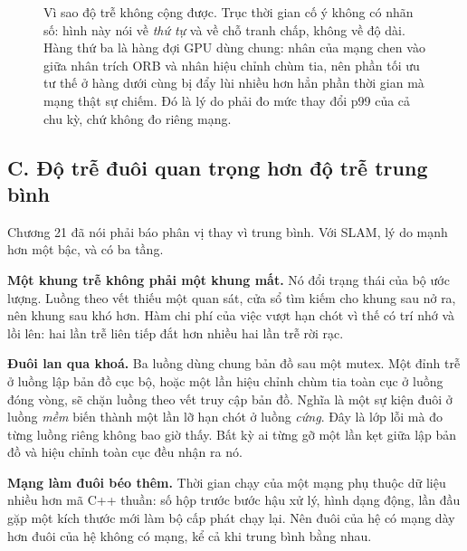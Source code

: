 \documentclass[../../deep_learning.tex]{subfiles}
\begin{document}
\begin{figure}[H]
{}
\caption{Vì sao độ trễ không cộng được. Trục thời gian cố ý không có nhãn số: hình này nói về \emph{thứ tự} và về chỗ tranh chấp, không về độ dài. Hàng thứ ba là hàng đợi GPU dùng chung: nhân của mạng chen vào giữa nhân trích ORB và nhân hiệu chỉnh chùm tia, nên phần tối ưu tư thế ở hàng dưới cùng bị đẩy lùi nhiều hơn hẳn phần thời gian mà mạng thật sự chiếm. Đó là lý do phải đo mức thay đổi p99 của cả chu kỳ, chứ không đo riêng mạng.}
\label{fig:f34-luong-gpu}
\end{figure}

\subsection{C. Độ trễ đuôi quan trọng hơn độ trễ trung bình}

Chương 21 đã nói phải báo phân vị thay vì trung bình. Với SLAM, lý do mạnh hơn một bậc, và có ba tầng.

\textbf{Một khung trễ không phải một khung mất.} Nó đổi trạng thái của bộ ước lượng. Luồng theo vết thiếu một quan sát, cửa sổ tìm kiếm cho khung sau nở ra, nên khung sau khó hơn. Hàm chi phí của việc vượt hạn chót vì thế có trí nhớ và lồi lên: hai lần trễ liên tiếp đắt hơn nhiều hai lần trễ rời rạc.

\textbf{Đuôi lan qua khoá.} Ba luồng dùng chung bản đồ sau một mutex. Một đỉnh trễ ở luồng lập bản đồ cục bộ, hoặc một lần hiệu chỉnh chùm tia toàn cục ở luồng đóng vòng, sẽ chặn luồng theo vết truy cập bản đồ. Nghĩa là một sự kiện đuôi ở luồng \emph{mềm} biến thành một lần lỡ hạn chót ở luồng \emph{cứng}. Đây là lớp lỗi mà đo từng luồng riêng không bao giờ thấy. Bất kỳ ai từng gỡ một lần kẹt giữa lập bản đồ và hiệu chỉnh toàn cục đều nhận ra nó.

\textbf{Mạng làm đuôi béo thêm.} Thời gian chạy của một mạng phụ thuộc dữ liệu nhiều hơn mã C++ thuần: số hộp trước bước hậu xử lý, hình dạng động, lần đầu gặp một kích thước mới làm bộ cấp phát chạy lại. Nên đuôi của hệ có mạng dày hơn đuôi của hệ không có mạng, kể cả khi trung bình bằng nhau.
\end{document}
